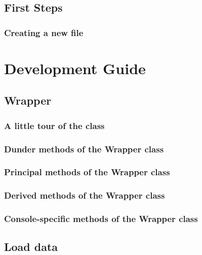\documentclass{book}
\newcommand{\mypart}[1]{\setcounter{chapter}{0} \part{#1}}
\begin{document}
    \chapter{First Steps}
        \section{Creating a new file}
            



\mypart{Development Guide} \label{chapter:dev_guide}
    \chapter{Wrapper}\label{sec:wrapper}
        \section{A little tour of the class}
            
        
        \section{Dunder methods of the Wrapper class}
            

        \section{Principal methods of the Wrapper class}
            

        \section{Derived methods of the Wrapper class}
            

        \section{Console-specific methods of the Wrapper class}
            

    
    \chapter{Load data} \label{chap:load_data}
        
\end{document}
